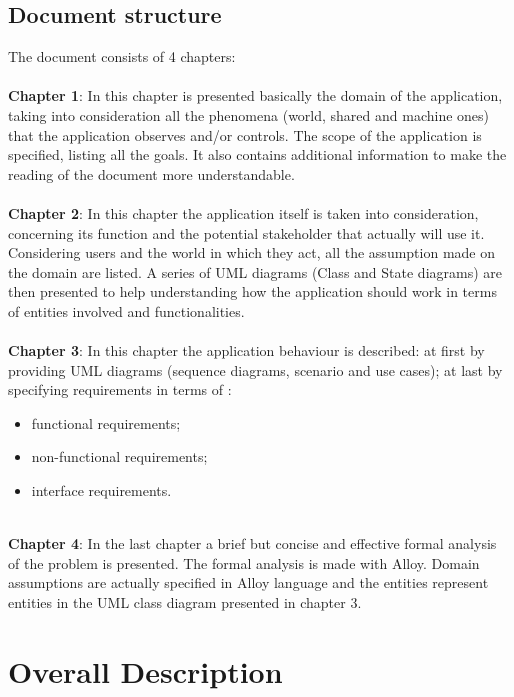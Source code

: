 \documentclass[a4paper]{report}
\begin{document}
\section{Document structure}

The document consists of 4 chapters:
\\ 
\\
\textbf{Chapter 1}: In this chapter is presented basically the domain of the application, taking into consideration all the phenomena (world, shared and machine ones) that the application observes and/or controls. The scope of the application is specified, listing all the goals.
It also contains additional information to make the reading of the document more understandable.\\ \\
\textbf{Chapter 2}: In this chapter the application itself is taken into consideration, concerning its function and the potential stakeholder that actually will use it. Considering users and the world in which they act, all the assumption made on the domain are listed. A series of UML diagrams (Class and State diagrams) are then presented to help understanding how the application should work in terms of entities involved and functionalities.\\ \\
\textbf{Chapter 3}: 
In this chapter the application behaviour is described: at first by providing  UML diagrams (sequence diagrams, scenario and use cases); at last by specifying requirements in terms of :
\begin{itemize}
\item functional requirements;
\item non-functional requirements;
\item interface requirements.\\ \\
\end{itemize}
\textbf{Chapter 4}: In the last chapter a brief but concise and effective formal analysis of the problem is presented. The formal analysis is made with Alloy.  Domain assumptions are actually specified in Alloy language and the entities represent entities in the UML class diagram presented in chapter 3.
\\

\chapter{Overall Description}
\end{document}
